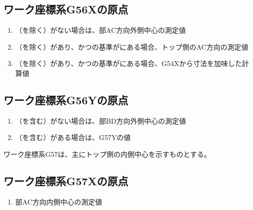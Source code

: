 \subsection{ワーク座標系{\ttfamily G56X}の原点}
\begin{enumerate}[label*=\sarrow]
\item \TopOutcut（\TopCurvedOutcut を除く）がない場合は、\TopEndFace 部AC方向外側中心の測定値
\item \TopOutcut（\TopCurvedOutcut を除く）があり、かつ\OutcutCenter の基準が\TopOutcut にある場合、トップ側のAC方向\OutcutCenter の測定値
\item \TopOutcut（\TopCurvedOutcut を除く）があり、かつ\OutcutCenter の基準が\BottomOutcut にある場合、{\ttfamily G54X}から\CenterlineEndFaceDif 寸法を加味した計算値
\end{enumerate}


\subsection{ワーク座標系{\ttfamily G56Y}の原点}
\begin{enumerate}[label*=\sarrow]
\item \TopOutcut（\TopCurvedOutcut を含む）がない場合は、\TopEndFace 部BD方向外側中心の測定値
\item \TopOutcut（\TopCurvedOutcut を含む）がある場合は、{\ttfamily G57Y}の値
\end{enumerate}



ワーク座標系{\ttfamily G57}は、主にトップ側の内側中心を示すものとする。


\subsection{ワーク座標系{\ttfamily G57X}の原点}
\begin{enumerate}[label*=\sarrow]
\item \TopEndFace 部AC方向内側中心の測定値
\end{enumerate}


